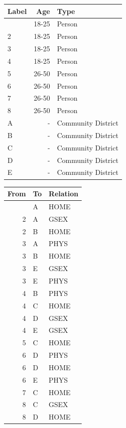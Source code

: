 \documentclass[
  letterpaper,
  DIV=11,
  numbers=noendperiod,
  oneside]{scrreprt}
\begin{document}
\begin{table}

\caption{\label{tbl-example-bipartite-nodes-edges}Sample person-place
network data}\begin{minipage}[t]{0.50\linewidth}

{\centering 

\begin{longtable}{lrl}
\tabularnewline

\toprule
Label & Age & Type \\ 
\midrule\addlinespace[2.5pt]
1 & 18-25 & Person \\ 
2 & 18-25 & Person \\ 
3 & 18-25 & Person \\ 
4 & 18-25 & Person \\ 
5 & 26-50 & Person \\ 
6 & 26-50 & Person \\ 
7 & 26-50 & Person \\ 
8 & 26-50 & Person \\ 
A & - & Community District \\ 
B & - & Community District \\ 
C & - & Community District \\ 
D & - & Community District \\ 
E & - & Community District \\ 
\bottomrule
\end{longtable}

}

\end{minipage}%
%
\begin{minipage}[t]{0.50\linewidth}

{\centering 

\begin{longtable}{rll}
\tabularnewline

\toprule
From & To & Relation \\ 
\midrule\addlinespace[2.5pt]
1 & A & HOME \\ 
2 & A & GSEX \\ 
2 & B & HOME \\ 
3 & A & PHYS \\ 
3 & B & HOME \\ 
3 & E & GSEX \\ 
3 & E & PHYS \\ 
4 & B & PHYS \\ 
4 & C & HOME \\ 
4 & D & GSEX \\ 
4 & E & GSEX \\ 
5 & C & HOME \\ 
6 & D & PHYS \\ 
6 & D & HOME \\ 
6 & E & PHYS \\ 
7 & C & HOME \\ 
8 & C & GSEX \\ 
8 & D & HOME \\ 
\bottomrule
\end{longtable}

}
\end{minipage}
\end{table}
\end{document}
